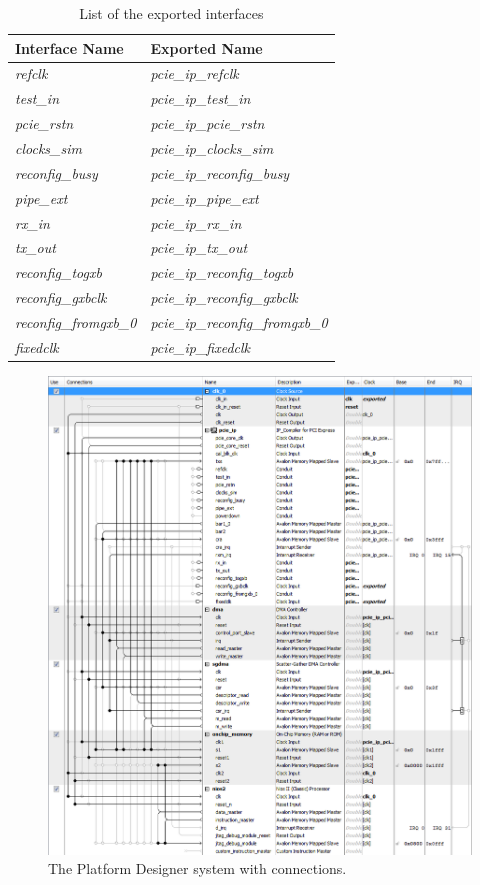 \documentclass[11pt, twoside, pdftex]{article}
\begin{document}
\begin{table}[H]
	\centering
	\caption{List of the exported interfaces}
	\begin{tabular}{| l | l |}
		\hline
		{\bf Interface Name} & {\bf Exported Name} \\
		\hline
		{\it refclk} & {\it pcie\_ip\_refclk} \\
		\hline
		{\it test\_in} & {\it pcie\_ip\_test\_in} \\
		\hline
		{\it pcie\_rstn} & {\it pcie\_ip\_pcie\_rstn} \\
		\hline
		{\it clocks\_sim} & {\it pcie\_ip\_clocks\_sim} \\
		\hline
		{\it reconfig\_busy} & {\it pcie\_ip\_reconfig\_busy} \\
		\hline
		{\it pipe\_ext} & {\it pcie\_ip\_pipe\_ext} \\
		\hline
		{\it rx\_in} & {\it pcie\_ip\_rx\_in} \\
		\hline
		{\it tx\_out} & {\it pcie\_ip\_tx\_out} \\
		\hline
		{\it reconfig\_togxb} & {\it pcie\_ip\_reconfig\_togxb} \\
		\hline
		{\it reconfig\_gxbclk} & {\it pcie\_ip\_reconfig\_gxbclk} \\
		\hline
		{\it reconfig\_fromgxb\_0} & {\it pcie\_ip\_reconfig\_fromgxb\_0} \\
		\hline
		{\it fixedclk} & {\it pcie\_ip\_fixedclk} \\
		\hline
	\end{tabular}
	\label{tab:qsys_exported}
\end{table}

\begin{figure}[H]
	\centering
	  \includegraphics[scale=0.6]{figures/qsys_system_connected.png}
	\caption{The Platform Designer system with connections.} 
	\label{fig:qsys_system_connected}
\end{figure}
\end{document}
